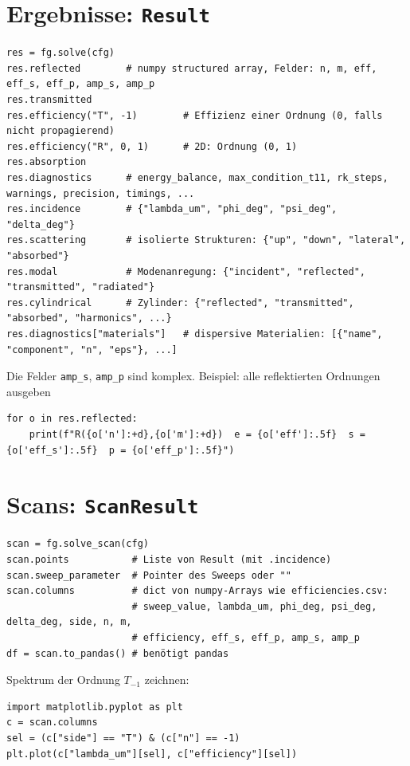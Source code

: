 \section{Ergebnisse: \texttt{Result}}
\begin{lstlisting}[style=py]
res = fg.solve(cfg)
res.reflected        # numpy structured array, Felder: n, m, eff, eff_s, eff_p, amp_s, amp_p
res.transmitted
res.efficiency("T", -1)        # Effizienz einer Ordnung (0, falls nicht propagierend)
res.efficiency("R", 0, 1)      # 2D: Ordnung (0, 1)
res.absorption
res.diagnostics      # energy_balance, max_condition_t11, rk_steps, warnings, precision, timings, ...
res.incidence        # {"lambda_um", "phi_deg", "psi_deg", "delta_deg"}
res.scattering       # isolierte Strukturen: {"up", "down", "lateral", "absorbed"}
res.modal            # Modenanregung: {"incident", "reflected", "transmitted", "radiated"}
res.cylindrical      # Zylinder: {"reflected", "transmitted", "absorbed", "harmonics", ...}
res.diagnostics["materials"]   # dispersive Materialien: [{"name", "component", "n", "eps"}, ...]
\end{lstlisting}
Die Felder \texttt{amp\_s}, \texttt{amp\_p} sind komplex. Beispiel: alle reflektierten Ordnungen ausgeben
\begin{lstlisting}[style=py]
for o in res.reflected:
    print(f"R({o['n']:+d},{o['m']:+d})  e = {o['eff']:.5f}  s = {o['eff_s']:.5f}  p = {o['eff_p']:.5f}")
\end{lstlisting}

\section{Scans: \texttt{ScanResult}}
\begin{lstlisting}[style=py]
scan = fg.solve_scan(cfg)
scan.points           # Liste von Result (mit .incidence)
scan.sweep_parameter  # Pointer des Sweeps oder ""
scan.columns          # dict von numpy-Arrays wie efficiencies.csv:
                      # sweep_value, lambda_um, phi_deg, psi_deg, delta_deg, side, n, m,
                      # efficiency, eff_s, eff_p, amp_s, amp_p
df = scan.to_pandas() # benötigt pandas
\end{lstlisting}
Spektrum der Ordnung $T_{-1}$ zeichnen:
\begin{lstlisting}[style=py]
import matplotlib.pyplot as plt
c = scan.columns
sel = (c["side"] == "T") & (c["n"] == -1)
plt.plot(c["lambda_um"][sel], c["efficiency"][sel])
\end{lstlisting}

